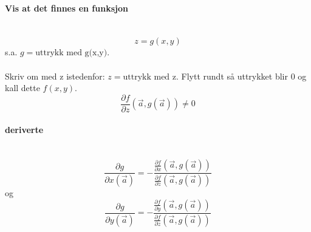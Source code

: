 \paragraph{Vis at det finnes en funksjon} \mbox{} \\
$$z = g(x,y)$$
s.a. $g = \text{uttrykk med g(x,y)}$.
\\\\
Skriv om med z istedenfor: $z = \text{uttrykk med z}$.
Flytt rundt så uttrykket blir 0 og kall dette $f(x,y)$.
$$\frac{\partial f}{\partial z}(\vec{a}, g(\vec{a})) \neq 0$$

\paragraph{deriverte} \mbox{} \\
$$\frac{\partial g}{\partial x(\vec{a})}
  = -\frac{\frac{\partial f}{\partial x}(\vec{a},g(\vec{a}))}
          {\frac{\partial f}{\partial z}(\vec{a},g(\vec{a}))}$$
og
$$\frac{\partial g}{\partial y(\vec{a})}
  = -\frac{\frac{\partial f}{\partial y}(\vec{a},g(\vec{a}))}
          {\frac{\partial f}{\partial z}(\vec{a},g(\vec{a}))}$$
